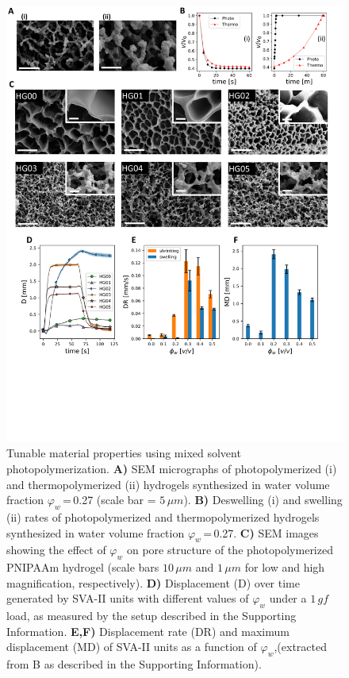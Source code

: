 \begin{figure}[t]
\centering
\includegraphics[width=\textwidth]{fig2.pdf}
\caption[Tunable material properties using mixed solvent photopolymerization]{Tunable material properties using mixed solvent photopolymerization.
\textbf{A)} SEM micrographs of photopolymerized (i) and thermopolymerized (ii) hydrogels synthesized in water volume fraction \(\varphi_{w}\)\,=\,0.27 (scale bar = $5\,\mu m$). \textbf{B)} Deswelling (i) and swelling (ii) rates of photopolymerized and thermopolymerized hydrogels synthesized in water volume fraction \(\varphi_{w}\)\,=\,0.27. \textbf{C)} SEM images showing the effect of $\varphi_w$ on pore structure of the photopolymerized PNIPAAm hydrogel (scale bars $10\,\mu m$ and $1\,\mu m$ for low and high magnification, respectively). \textbf{D)} Displacement (D) over time generated by SVA-II units with different values of \(\varphi_{w}\)  under a $1\,gf$ load, as measured by the setup described in the Supporting Information. \textbf{E,F)} Displacement rate (DR) and maximum displacement (MD) of SVA-II units as a function of $\varphi_w$,(extracted from B as described in the Supporting Information).}
\label{fig:2}
\end{figure}
